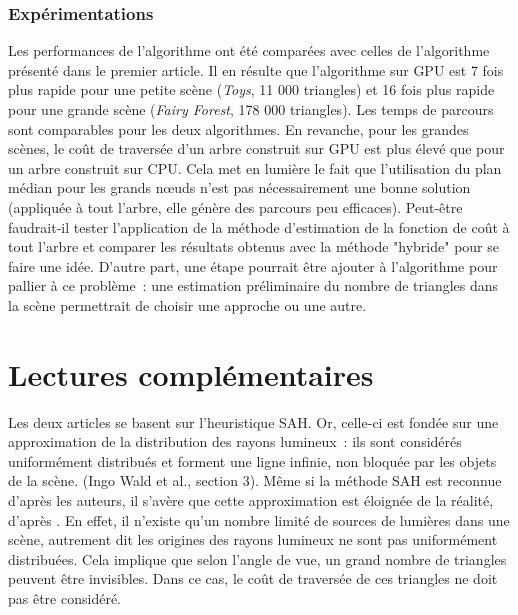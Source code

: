\documentclass[a4paper]{article}
\begin{document}
\subsubsection{Expérimentations}
Les performances de l'algorithme ont été comparées avec celles de l'algorithme présenté dans le premier article. Il en résulte que l'algorithme sur GPU est 7 fois plus rapide pour une petite scène (\textit{Toys}, 11 000 triangles) et 16 fois plus rapide pour une grande scène (\textit{Fairy Forest}, 178 000 triangles). Les temps de parcours sont comparables pour les deux algorithmes. En revanche, pour les grandes scènes, le coût de traversée d'un arbre construit sur GPU est plus élevé que pour un arbre construit sur CPU. Cela met en lumière le fait que l'utilisation du plan médian pour les grands nœuds n'est pas nécessairement une bonne solution (appliquée à tout l'arbre, elle génère des parcours peu efficaces). Peut-être faudrait-il tester l'application de la méthode d'estimation de la fonction de coût à tout l'arbre et comparer les résultats obtenus avec la méthode "hybride" pour se faire une idée. D'autre part, une étape pourrait être ajouter à l'algorithme pour pallier à ce problème~: une estimation préliminaire du nombre de triangles dans la scène permettrait de choisir une approche ou une autre.

\section{Lectures complémentaires}

Les deux articles se basent sur l'heuristique SAH. Or, celle-ci est fondée sur une approximation de la distribution des rayons lumineux~: ils sont considérés uniformément distribués et forment une ligne infinie, non bloquée par les objets de la scène. (Ingo Wald et al., section 3). Même si la méthode SAH est reconnue d'après les auteurs, il s'avère que cette approximation est éloignée de la réalité, d'après \cite{anti-sah}. En effet, il n'existe qu'un nombre limité de sources de lumières dans une scène, autrement dit les origines des rayons lumineux ne sont pas uniformément distribuées. Cela implique que selon l'angle de vue, un grand nombre de triangles peuvent être invisibles. Dans ce cas, le coût de traversée de ces triangles ne doit pas être considéré.
\end{document}
